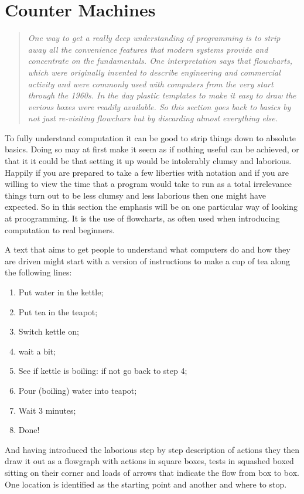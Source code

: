 \section{Counter Machines}
\begin{quotation}\textit{
One way to get a really deep understanding of programming is to strip
away all the convenience features that modern systems provide and concentrate
on the fundamentals. One interpretation says that flowcharts, which were
originally invented to describe engineering and commercial activity and were
commonly used with computers from the very start through the 1960s. In the
day plastic templates to make it easy to draw the verious boxes were
readily available. So this section goes back to basics by not just
re-visiting flowchars but by discarding almost everything else.
}\end{quotation}
To fully understand computation it can be good to strip things down to
absolute basics. Doing so may at first make it seem as if nothing useful
can be achieved, or that it it could be that setting it up would be
intolerably clumsy and laborious. Happily if you are prepared to take
a few liberties with notation and if you are willing to view the time
that a program would take to run as a total irrelevance things turn out
to be less clumsy and less laborious then one might have expected. So
in this section the emphasis will be on one particular way of looking
at proogramming. It is the use of flowcharts, as often used when introducing
computation to real beginners.

A text that aims to get people to understand what computers do and
how they are driven might start with a version of instructions to
make a cup of tea along the following lines:
\begin{enumerate}
\item Put water in the kettle;
\item Put tea in the teapot;
\item Switch kettle on;
\item wait a bit;
\item See if kettle is boiling: if not go back to step 4;
\item Pour (boiling) water into teapot;
\item Wait 3 minutes;
\item Done!
\end{enumerate}
And having introduced the laborious step by step description of actions
they then draw it out as a flowgraph with actions in square boxes,
tests in squashed boxed sitting on their corner and loads of arrows
that indicate the flow from box to box. One location is identified as the
starting point and another and where to stop.

